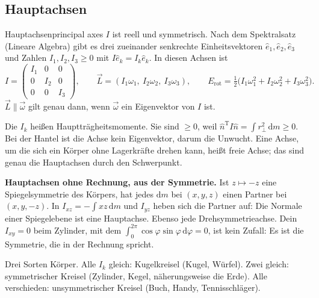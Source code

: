 \documentclass[deutsch]{kaelearn}
\newcommand\dd{\mathrm{d}}
\begin{document}
\subsection{Hauptachsen}

\begin{theorem}{Hauptachsen}{principal axes}
$I$ ist reell und symmetrisch. Nach dem Spektralsatz (Lineare Algebra) gibt es drei zueinander senkrechte Einheitsvektoren
$\hat e_1,\hat e_2,\hat e_3$ und Zahlen $I_1,I_2,I_3\ge0$ mit $I\hat e_k = I_k\hat e_k$. In diesen Achsen ist
\[
  I = \begin{pmatrix}I_1&0&0\\0&I_2&0\\0&0&I_3\end{pmatrix},\qquad \vec L = (I_1\omega_1,\ I_2\omega_2,\ I_3\omega_3),\qquad
  E_{\mathrm{rot}} = \tfrac12\big(I_1\omega_1^2+I_2\omega_2^2+I_3\omega_3^2\big).
\]
$\vec L\parallel\vec\omega$ gilt genau dann, wenn $\vec\omega$ ein Eigenvektor von $I$ ist.
\end{theorem}

Die $I_k$ heißen Hauptträgheitsmomente. Sie sind $\ge0$, weil $\hat n^{\mathrm T}I\hat n = \int r_\perp^2\,\dd m\ge0$. Bei der Hantel ist die
Achse kein Eigenvektor, darum die Unwucht. Eine Achse, um die sich ein Körper ohne Lagerkräfte drehen kann, heißt freie Achse; das sind
genau die Hauptachsen durch den Schwerpunkt.

\textbf{Hauptachsen ohne Rechnung, aus der Symmetrie.} Ist $z\mapsto-z$ eine Spiegelsymmetrie des Körpers, hat jedes $\dd m$ bei
$(x,y,z)$ einen Partner bei $(x,y,-z)$. In $I_{xz} = -\int xz\,\dd m$ und $I_{yz}$ heben sich die Partner auf: Die Normale einer
Spiegelebene ist eine Hauptachse. Ebenso jede Drehsymmetrieachse. Dein $I_{xy} = 0$ beim Zylinder, mit dem
$\int_0^{2\pi}\cos\varphi\sin\varphi\,\dd\varphi = 0$, ist kein Zufall: Es ist die Symmetrie, die in der Rechnung spricht.

Drei Sorten Körper. Alle $I_k$ gleich: Kugelkreisel (Kugel, Würfel). Zwei gleich: symmetrischer Kreisel (Zylinder, Kegel, näherungsweise die
Erde). Alle verschieden: unsymmetrischer Kreisel (Buch, Handy, Tennisschläger).

\end{document}
